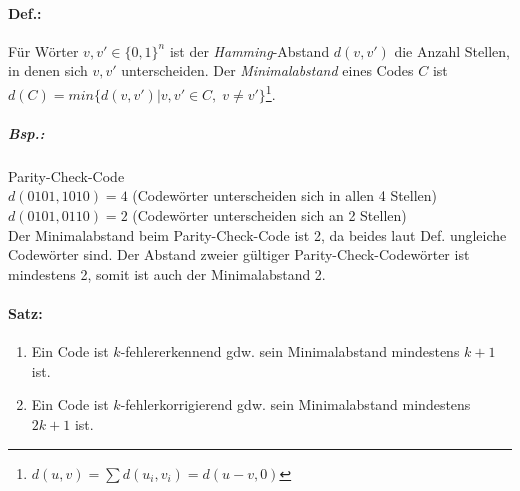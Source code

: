 \paragraph{Def.:} Für Wörter $v,v'\in \{0,1\}^n$ ist der \emph{Hamming}-Abstand $d(v,v')$ die Anzahl Stellen, in denen sich $v,v'$ unterscheiden. Der \emph{Minimalabstand} eines Codes $C$ ist $d(C)=min\{d(v,v')|v,v'\in C, \; v\not = v'\}$\footnote{$d(u,v)=\sum d(u_i, v_i)=d(u-v,0)$}.
\subparagraph{Bsp.:} Parity-Check-Code\\
$d(0101,1010)=4$ (Codewörter unterscheiden sich in allen 4 Stellen)\\
$d(0101,0110)=2$ (Codewörter unterscheiden sich an 2 Stellen)\\
Der Minimalabstand beim Parity-Check-Code ist 2, da beides laut Def. ungleiche Codewörter sind. Der Abstand zweier gültiger Parity-Check-Codewörter ist mindestens 2, somit ist auch der Minimalabstand 2.

\paragraph{Satz:}
\begin{enumerate}
\item Ein Code ist $k$-fehlererkennend gdw. sein Minimalabstand mindestens $k+1$ ist.
\item Ein Code ist $k$-fehlerkorrigierend gdw. sein Minimalabstand mindestens $2k+1$ ist.
\end{enumerate} 

